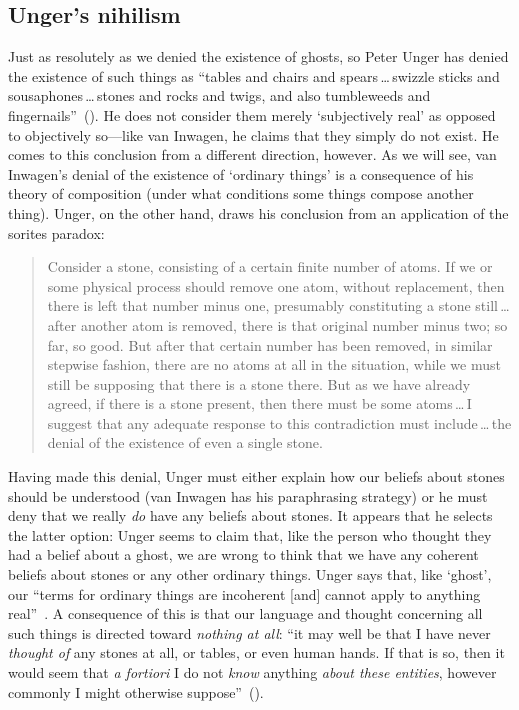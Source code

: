\documentclass[11pt]{article}
\newenvironment{squote}{\begin{quote}\begin{singlespace}}{\end{singlespace}\end{quote}}
\begin{document}
\begin{spacing}{1.5}
\subsection{Unger's nihilism}
\label{unger}
Just as resolutely as we denied the existence of ghosts, so Peter Unger has denied the existence of such things as ``tables and chairs and spears\,\ldots\,swizzle sticks and sousaphones\,\ldots\,stones and rocks and twigs, and also tumbleweeds and fingernails''~(\citeyear[117]{unger1979}). He does not consider them merely `subjectively real' as opposed to objectively so---like van Inwagen, he claims that they simply do not exist. He comes to this conclusion from a different direction, however. As we will see, van Inwagen's denial of the existence of `ordinary things' is a consequence of his theory of composition (under what conditions some things compose another thing). Unger, on the other hand, draws his conclusion from an application of the sorites paradox:
\begin{squote}
Consider a stone, consisting of a certain finite number of atoms. If we or some physical process should remove one atom, without replacement, then there is left that number minus one, presumably constituting a stone still\,\ldots\,after another atom is removed, there is that original number minus two; so far, so good. But after that certain number has been removed, in similar stepwise fashion, there are no atoms at all in the situation, while we must still be supposing that there is a stone there. But as we have already agreed, if there is a stone present, then there must
be some atoms\,\ldots\,I suggest that any adequate response to this contradiction must include\,\ldots\,the denial of the existence of even a single stone.~\citep[121--122]{unger1979}
\end{squote}

Having made this denial, Unger must either explain how our beliefs about stones should be understood (van Inwagen has his paraphrasing strategy) or he must deny that we really {\em do} have any beliefs about stones. It appears that he selects the latter option: Unger seems to claim that, like the person who thought they had a belief about a ghost, we are wrong to think that we have any coherent beliefs about stones or any other ordinary things. Unger says that, like `ghost', our ``terms for ordinary things are incoherent [and] cannot apply to anything real''~\citep[147]{unger1979}. A consequence of this is that our language and thought concerning all such things is directed toward {\em nothing at all}: ``it may well be that I have never {\em thought of} any stones at all, or tables, or even human hands. If that is so, then it would seem that {\em a fortiori} I do not {\em know} anything {\em about these entities}, however commonly I might otherwise suppose''~(\citeyear[458]{unger1980a}).


\end{spacing}
\end{document}

